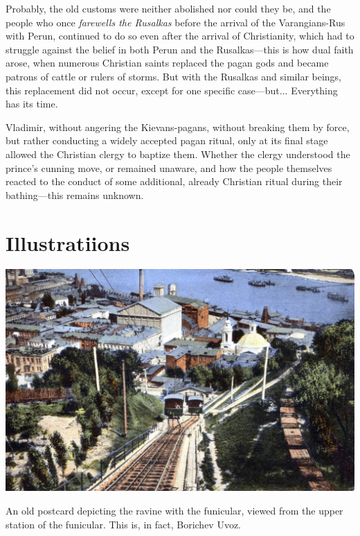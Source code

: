 \documentclass[a5paper,11pt,openany]{article}
\begin{document}
Probably, the old customs were neither abolished nor could they be, and the people who once \textit{farewells the Rusalkas} before the arrival of the Varangians-Rus with Perun, continued to do so even after the arrival of Christianity, which had to struggle against the belief in both Perun and the Rusalkas—this is how dual faith arose, when numerous Christian saints replaced the pagan gods and became patrons of cattle or rulers of storms. But with the Rusalkas and similar beings, this replacement did not occur, except for one specific case—but... Everything has its time.

Vladimir, without angering the Kievans-pagans, without breaking them by force, but rather conducting a widely accepted pagan ritual, only at its final stage allowed the Christian clergy to baptize them. Whether the clergy understood the prince’s cunning move, or remained unaware, and how the people themselves reacted to the conduct of some additional, already Christian ritual during their bathing—this remains unknown.

\newpage

\section{Illustratiions}


\vspace*{\fill}


\begin{center}
\includegraphics[width=\linewidth]{s-mihpod.jpg}
\end{center}

An old postcard depicting the ravine with the funicular, viewed from the upper station of the funicular. This is, in fact, Borichev Uvoz.
\end{document}
